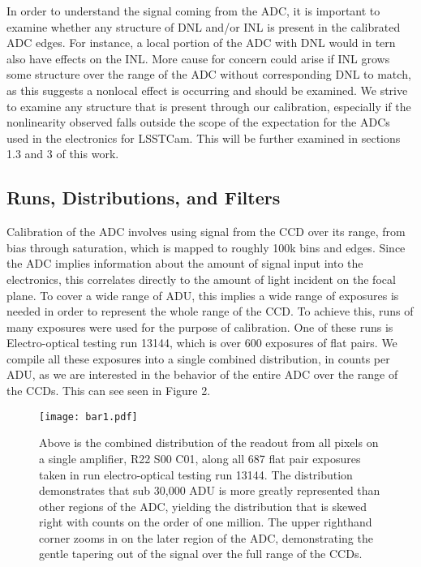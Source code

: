 \documentclass[11pt, letterpaper]{article}
\begin{document}
In order to understand the signal coming from the ADC, it is important to examine whether any structure of DNL and/or INL is present in the calibrated ADC edges.
For instance, a local portion of the ADC with DNL would in tern also have effects on the INL.
More cause for concern could arise if INL grows some structure over the range of the ADC without corresponding DNL to match, as this suggests a nonlocal effect is occurring and should be examined.
We strive to examine any structure that is present through our calibration, especially if the nonlinearity observed falls outside the scope of the expectation for the ADCs used in the electronics for LSSTCam. 
This will be further examined in sections 1.3 and 3 of this work.


\subsection{Runs, Distributions, and Filters}
\indent

Calibration of the ADC involves using signal from the CCD over its range, from bias through saturation, which is mapped to roughly 100k bins and edges. 
Since the ADC implies information about the amount of signal input into the electronics, this correlates directly to the amount of light incident on the focal plane.
To cover a wide range of ADU, this implies a wide range of exposures is needed in order to represent the whole range of the CCD.
To achieve this, runs of many exposures were used for the purpose of calibration. 
One of these runs is Electro-optical testing run 13144, which is over 600 exposures of flat pairs. 
We compile all these exposures into a single combined distribution, in counts per ADU, as we are interested in the behavior of the entire ADC over the range of the CCDs. 
This can see seen in Figure 2. 

\begin{figure}
	\texttt{[image: bar1.pdf]}
	\caption{Above is the combined distribution of the readout from all pixels on a single amplifier, R22 S00 C01, along all 687 flat pair exposures taken in run electro-optical testing run 13144. The distribution demonstrates that sub 30,000 ADU is more greatly represented than other regions of the ADC, yielding the distribution that is skewed right with counts on the order of one million. The upper righthand corner zooms in on the later region of the ADC, demonstrating the gentle tapering out of the signal over the full range of the CCDs.}
\end{figure}
\indent 
\end{document}

